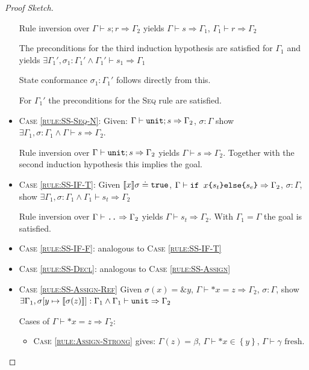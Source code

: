 \documentclass[twoside, english, final]{sdqthesis}
\newcommand{\set}[1]{\left\{ #1 \right\}}
\newcommand{\bbracket}[1]{\llbracket #1 \rrbracket}
\theoremstyle{definition}
\begin{document}
\begin{proof}[Proof Sketch]
\begin{itemize}
    Rule inversion over $\Gamma \vdash s; r \Rightarrow \Gamma_2$ yields $\Gamma \vdash s \Rightarrow \Gamma_1$, $\Gamma_1 \vdash r \Rightarrow \Gamma_2$

    The preconditions for the third induction hypothesis are satisfied for $\Gamma_1$ and yields
    $\exists \Gamma_1', \sigma_1 : \Gamma_1' \wedge \Gamma_1' \vdash s_1 \Rightarrow \Gamma_1$

    State conformance $\sigma_1 : \Gamma_1'$ follows directly from this.

    For $\Gamma_1'$ the preconditions for the \textsc{Seq} rule are satisfied.
  \item \textsc{Case \cref{rule:SS-Seq-N}}: 
    Given: $\Gamma \vdash \code{unit}; s \Rightarrow \Gamma_2$, $\sigma : \Gamma$
    show $\exists \Gamma_1, \sigma : \Gamma_1 \wedge \Gamma \vdash s \Rightarrow \Gamma_2$.

    Rule inversion over $\Gamma \vdash \code{unit}; s \Rightarrow \Gamma_2$ yields $\Gamma \vdash s \Rightarrow \Gamma_2$.
    Together with the second induction hypothesis this implies the goal.
  \item \textsc{Case \cref{rule:SS-IF-T}}:
     Given $\llbracket x \rrbracket \sigma \doteq \code{true}$, $\Gamma \vdash \code{if $x$\{$s_t$\}else\{$s_e$\}} \Rightarrow \Gamma_2$, $\sigma : \Gamma$, show $\exists \Gamma_1, \sigma : \Gamma_1 \wedge \Gamma_1 \vdash s_t \Rightarrow \Gamma_2$
    
    Rule inversion over $\Gamma \vdash \code{..} \Rightarrow \Gamma_2$ yields $\Gamma \vdash s_t \Rightarrow \Gamma_2$.
    With $\Gamma_1 = \Gamma$ the goal is satisfied.
  \item \textsc{Case \cref{rule:SS-IF-F}}: analogous to \textsc{Case \cref{rule:SS-IF-T}}
  \item \textsc{Case \cref{rule:SS-Decl}}: analogous to \textsc{Case \cref{rule:SS-Assign}}
  \item \textsc{Case \cref{rule:SS-Assign-Ref}}
    Given $ \sigma(x) = \&y $, $\Gamma \vdash *x = z \Rightarrow \Gamma_2$, $\sigma : \Gamma$, show
    $\exists \Gamma_1, \sigma[y \mapsto \bbracket{\sigma(z)}] : \Gamma_1 \wedge \Gamma_1 \vdash \code{unit} \Rightarrow \Gamma_2$

    Cases of $\Gamma \vdash *x = z \Rightarrow \Gamma_2$:
    \begin{itemize}
      \item \textsc{Case \cref{rule:Assign-Strong}} gives:
        $\Gamma(z) = \beta$, $\Gamma \vdash *x \in \set{y}$, $\Gamma \vdash \gamma \text{ fresh}$.
    

\end{itemize}
\end{itemize}
\end{proof}
\end{document}
